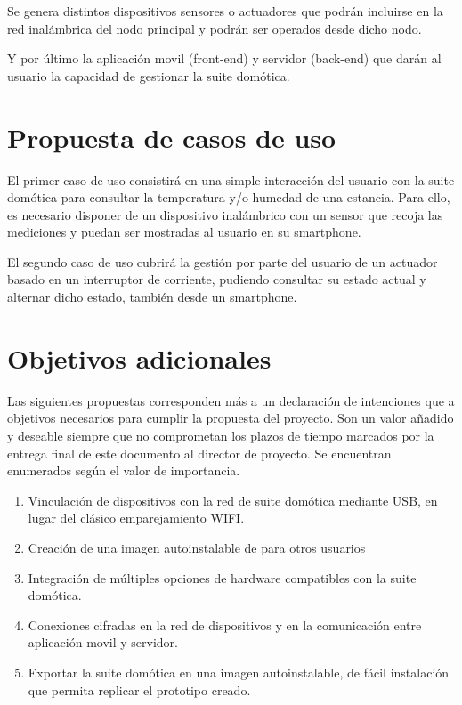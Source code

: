 Se genera distintos dispositivos sensores o actuadores que podrán incluirse en la red inalámbrica del nodo principal y podrán ser operados desde dicho nodo.

Y por último la aplicación movil (front-end) y servidor (back-end) que darán al usuario la capacidad de gestionar la suite domótica.

\section{Propuesta de casos de uso}
\label{ch:Capitulo3.3}

El primer caso de uso consistirá en una simple interacción del usuario con la suite domótica para consultar la temperatura y/o humedad de una estancia. Para ello, es necesario disponer de un dispositivo inalámbrico con un sensor que recoja las mediciones y puedan ser mostradas al usuario en su smartphone.

El segundo caso de uso cubrirá la gestión por parte del usuario de un actuador basado en un interruptor de corriente, pudiendo consultar su estado actual y alternar dicho estado, también desde un smartphone.

\section{Objetivos adicionales}
\label{ch:Capitulo3.4}

Las siguientes propuestas corresponden más a un declaración de intenciones que a objetivos necesarios para cumplir la propuesta del proyecto. Son un valor añadido y deseable siempre que no comprometan los plazos de tiempo marcados por la entrega final de este documento al director de proyecto. Se encuentran enumerados según el valor de importancia.

\begin{enumerate}

  \item Vinculación de dispositivos con la red de suite domótica mediante USB, en lugar del clásico emparejamiento WIFI.

  \item Creación de una imagen autoinstalable de para otros usuarios

  \item Integración de múltiples opciones de hardware compatibles con la suite domótica.

  \item Conexiones cifradas en la red de dispositivos y en la comunicación entre aplicación movil y servidor.

  \item Exportar la suite domótica en una imagen autoinstalable, de fácil instalación que permita replicar el prototipo creado.

\end{enumerate}
